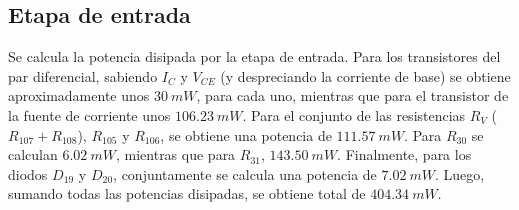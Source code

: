 \subsection{Etapa de entrada}
Se calcula la potencia disipada por la etapa de entrada. Para los transistores del par diferencial, sabiendo $I_C$ y $V_{CE}$ (y despreciando la corriente de base) se obtiene aproximadamente unos $30 \ mW$, para cada uno, mientras que para el transistor de la fuente de corriente unos $106.23 \ mW$. Para el conjunto de las resistencias $R_V$ ($R_{107} + R_108$), $R_{105}$ y $R_{106}$, se obtiene una potencia de $111.57 \ mW$. Para $R_{30}$ se calculan $6.02 \ mW$, mientras que para $R_{31}$, $143.50 \ mW$. Finalmente, para los diodos $D_{19}$ y $D_{20}$, conjuntamente se calcula una potencia de $7.02 \ mW$. Luego, sumando todas las potencias disipadas, se obtiene total de $404.34 \ mW$. 
%
